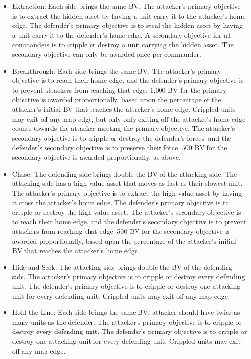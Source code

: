 \documentclass[UTF8]{article}
\begin{document}
\begin{itemize}

\item Extraction: Each side brings the same BV.
The attacker's primary objective is to extract the hidden asset by having a unit carry it to the attacker's home edge.
The defender's primary objective is to steal the hidden asset by having a unit carry it to the defender's home edge.
A secondary objective for all commanders is to cripple or destroy a unit carrying the hidden asset.
The secondary objective can only be awarded once per commander.

\item Breakthrough: Each side brings the same BV.
The attacker's primary objective is to reach their home edge, and the defender's primary objective is to prevent attackers from reaching that edge.
1,000 BV for the primary objective is awarded proportionally, based upon the percentage of the attacker's initial BV that reaches the attacker's home edge.
Crippled units may exit off any map edge, but only only exiting off the attacker's home edge counts towards the attacker meeting the primary objective.
The attacker's secondary objective is to cripple or destroy the defender's forces, and the defender's secondary objective is to preserve their force.
500 BV for the secondary objective is awarded proportionally, as above. 

\item Chase: The defending side brings double the BV of the attacking side.
The attacking side has a high value asset that moves as fast as their slowest unit.
The attacker's primary objective is to extract the high value asset by having it cross the attacker's home edge.
The defender's primary objective is to cripple or destroy the high value asset.
The attacker's secondary objective is to reach their home edge, and the defender's secondary objective is to prevent attackers from reaching that edge.
500 BV for the secondary objective is awarded proportionally, based upon the percentage of the attacker's initial BV that reaches the attacker's home edge.

\item Hide and Seek: The attacking side brings double the BV of the defending side.
The attacker's primary objective is to cripple or destroy every defending unit.
The defender's primary objective is to cripple or destroy one attacking unit for every defending unit.
Crippled units may exit off any map edge.

\item Hold the Line: Each side brings the same BV; attacker should have twice as many units as the defender.
The attacker's primary objective is to cripple or destroy every defending unit.
The defender's primary objective is to cripple or destroy one attacking unit for every defending unit.
Crippled units may exit off any map edge.

\end{itemize}
\end{document}
